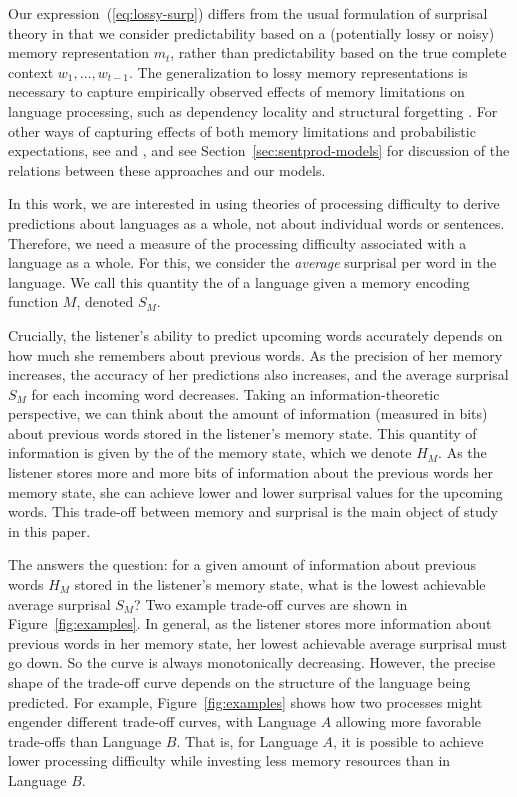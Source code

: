 Our expression~(\ref{eq:lossy-surp}) differs from the usual formulation of surprisal theory in that we consider predictability based on a (potentially lossy or noisy) memory representation $m_t$, rather than predictability based on the true complete context $w_1, \dots, w_{t-1}$. The generalization to lossy memory representations is necessary to capture empirically observed effects of memory limitations on language processing, such as dependency locality and structural forgetting \citep{futrell2020lossy}. For other ways of capturing effects of both memory limitations and probabilistic expectations, see \citet{demberg-incremental-2013} and \citet{rasmussen2018left}, and see Section~\ref{sec:sentprod-models} for discussion of the relations between these approaches and our models.


In this work, we are interested in using theories of processing difficulty to derive predictions about languages as a whole, not about individual words or sentences. Therefore, we need a measure of the processing difficulty associated with a language as a whole. For this, we consider the \emph{average} surprisal per word in the language. We call this quantity the  of a language given a memory encoding function $M$, denoted $S_M$.

Crucially, the listener's ability to predict upcoming words accurately depends on how much she remembers about previous words. As the precision of her memory increases, the accuracy of her predictions also increases, and the average surprisal $S_M$ for each incoming word decreases. Taking an information-theoretic perspective, we can think about the amount of information (measured in bits) about previous words stored in the listener's memory state. This quantity of information is given by the  of the memory state, which we denote $H_M$. As the listener stores more and more bits of information about the previous words her memory state, she can achieve lower and lower surprisal values for the upcoming words. This trade-off between memory and surprisal is the main object of study in this paper.

The  answers the question: 
for a given amount of information about previous words $H_M$ stored in the listener's memory state, what is the lowest achievable average surprisal $S_M$? Two example trade-off curves are shown in Figure~\ref{fig:examples}. In general, as the listener stores more information about previous words in her memory state, her lowest achievable average surprisal must go down. So the curve is always monotonically decreasing. However, the precise shape of the trade-off curve depends on the structure of the language being predicted. For example, Figure~\ref{fig:examples} shows how two processes might engender different trade-off curves, with Language $A$ allowing more favorable trade-offs than Language $B$. That is, for Language $A$, it is possible to achieve lower processing difficulty while investing less memory resources than in Language $B$.

